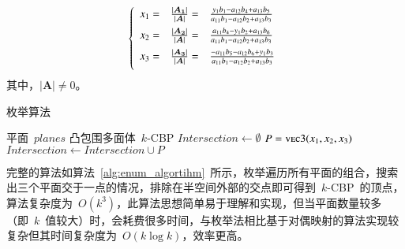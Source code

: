 \begin{equation}
  \label{equa:solution:three-planes}
  \left\{
    \begin{array}{lll}
      x_1 =& \frac{|\bm{A_1}|}{|\bm{A}|} =&\frac{y_1b_1-a_{12}b_4+a_{13}b_5}{a_{11}b_1-a_{12}b_2+a_{13}b_3} 
      \vspace{0.5em}\\ \vspace{0.5em}
      x_2 =& \frac{|\bm{A_2}|}{|\bm{A}|} =&\frac{a_{11}b_4-y_{1}b_2+a_{13}b_6}{a_{11}b_1-a_{12}b_2+a_{13}b_3} 
      \\ \vspace{0.5em}
      x_3 =& \frac{|\bm{A_3}|}{|\bm{A}|} =&\frac{-a_{11}b_5-a_{12}b_6+y_{1}b_3}{a_{11}b_1-a_{12}b_2+a_{13}b_3}
    \end{array}
  \right.
\end{equation}其中，$|\bm{A}| \not= 0$。


\begin{algorithm}[htbp]
\small
\caption{枚举算法}
\label{alg:enum_algortihm}
\begin{algorithmic}[1]
\Require
平面~$planes$
\Ensure
凸包围多面体~$k$-CBP
    \State $Intersection \gets \emptyset $
                      \State $P = \Call{vec3}{x_1, x_2, x_3}$
                        \State {}
                        \State $Intersection \gets Intersection \cup P$
                      \EndIf
                  \EndIf
              \EndIf
          \EndFor
     \EndFor
     \EndIf
  \EndFor
  \State {}
\EndFunction
\end{algorithmic}
\end{algorithm}

完整的算法如算法~\ref{alg:enum_algortihm}~所示，枚举遍历所有平面的组合，搜索出三个平面交于一点的情况，排除在半空间外部的交点即可得到~$k$-CBP~的顶点，算法复杂度为~$O(k^3)$，此算法思想简单易于理解和实现，但当平面数量较多（即~$k$~值较大）时，会耗费很多时间，与枚举法相比基于对偶映射的算法实现较复杂但其时间复杂度为~$O(k \log k)$，效率更高。

